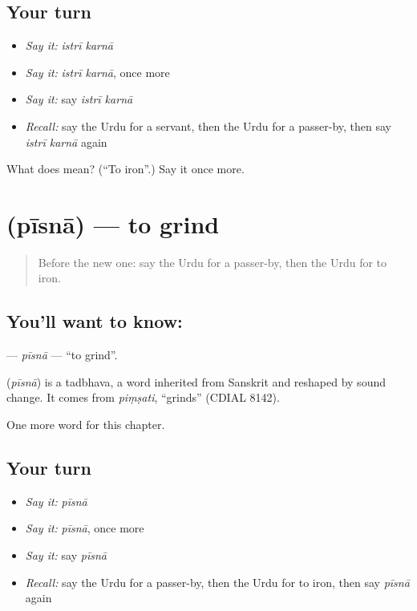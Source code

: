 \subsection*{Your turn}
\begin{itemize}
\raggedright
  \item \emph{Say it:} \emph{istrī karnā}
  \item \emph{Say it:} \emph{istrī karnā}, once more
  \item \emph{Say it:} say \emph{istrī karnā}
  \item \emph{Recall:} say the Urdu for a servant, then the Urdu for a passer-by, then say \emph{istrī karnā} again
\end{itemize}

\begin{tcolorbox}[breakable,colback=teal!4,colframe=teal!35!black,title={Before you move on}]
What does   mean? (\textquotedblleft{}To iron\textquotedblright{}.) Say it once more.
\end{tcolorbox}
\section[\texorpdfstring{\ur{پیسنا} (pīsnā)}{پیسنا (pīsnā)}]{ (pīsnā) — to grind}

\label{lesson:UR-C212-pisna}



\begin{quote}
Before the new one: say the Urdu for a passer-by, then the Urdu for to iron.
\end{quote}

\subsection*{You'll want to know: }
\textbf{} — \emph{pīsnā} — \textquotedblleft{}to grind\textquotedblright{}.

\begin{cousinweb}
\textbf{} (\emph{pīsnā}) is a tadbhava, a word inherited from Sanskrit and reshaped by sound change. It comes from \emph{piṃṣati}, \textquotedblleft{}grinds\textquotedblright{} (CDIAL 8142).
\end{cousinweb}

\begin{grammarlens}[title={What you've built}]
One more word for this chapter.
\end{grammarlens}

\subsection*{Your turn}
\begin{itemize}
\raggedright
  \item \emph{Say it:} \emph{pīsnā}
  \item \emph{Say it:} \emph{pīsnā}, once more
  \item \emph{Say it:} say \emph{pīsnā}
  \item \emph{Recall:} say the Urdu for a passer-by, then the Urdu for to iron, then say \emph{pīsnā} again
\end{itemize}

